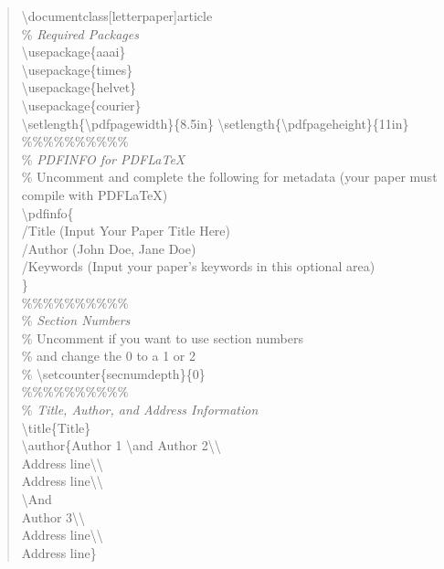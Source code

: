 \documentclass[letterpaper]{article}
\begin{document}
\begin{quote}
  \begin{small}
    \textbackslash documentclass[letterpaper]{article}\\
    \% \textit{Required Packages}\\
    \textbackslash usepackage\{aaai\}\\
    \textbackslash usepackage\{times\}\\
    \textbackslash usepackage\{helvet\}\\
    \textbackslash usepackage\{courier\}\\
    \textbackslash setlength\{\textbackslash pdfpagewidth\}\{8.5in\}
    \textbackslash setlength\{\textbackslash pdfpageheight\}\{11in\}\\
    \%\%\%\%\%\%\%\%\%\%\\
    \% \textit{PDFINFO for PDF\LaTeX{}}\\
    \% Uncomment and complete the following for metadata (your paper must compile with PDF\LaTeX{})\\
    \textbackslash pdfinfo\{\\
    /Title (Input Your Paper Title Here)\\
    /Author (John Doe, Jane Doe)\\
    /Keywords (Input your paper's keywords in this optional area)\\
    \}\\
    \%\%\%\%\%\%\%\%\%\%\\
    \% \textit{Section Numbers}\\
    \% Uncomment if you want to use section numbers\\
    \% and change the 0 to a 1 or 2\\
    \% \textbackslash setcounter\{secnumdepth\}\{0\}\\
    \%\%\%\%\%\%\%\%\%\%\\
    \% \textit{Title, Author, and Address Information}\\
    \textbackslash title\{Title\}\\
    \textbackslash author\{Author 1 \textbackslash and Author 2\textbackslash\textbackslash \\
    Address line\textbackslash\textbackslash\\ Address line\textbackslash\textbackslash \\
    \textbackslash And\\
    Author 3\textbackslash\textbackslash\\ Address line\textbackslash\textbackslash\\ Address line\}\\

\end{small}
\end{quote}
\end{document}
